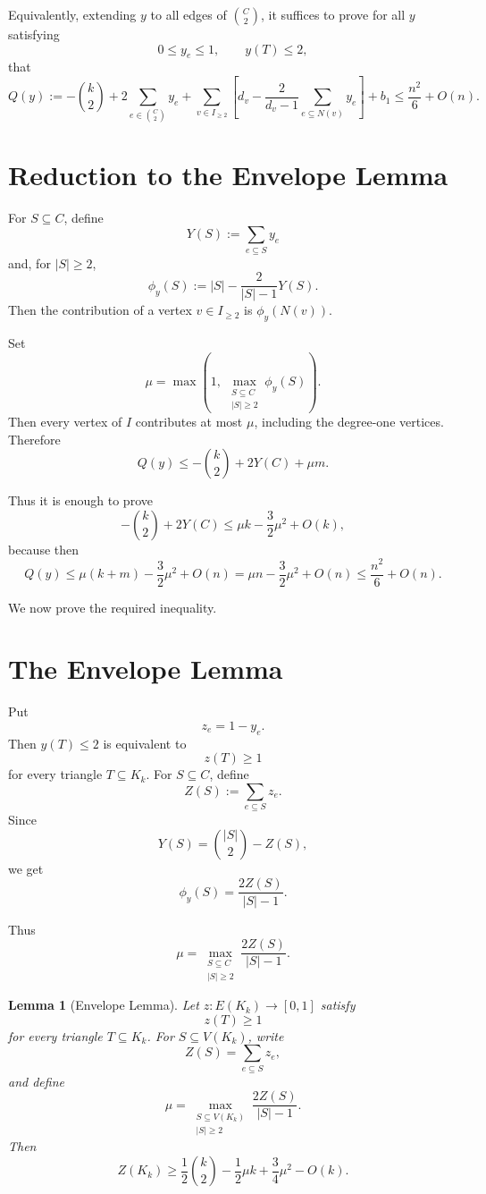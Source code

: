\documentclass[11pt]{article}
\newtheorem{lemma}{Lemma}
\begin{document}
Equivalently, extending \(y\) to all edges of \(\binom C2\), it suffices to prove for all \(y\) satisfying
\[
    0\le y_e\le1,\qquad y(T)\le2,
\]
that
\[
    Q(y):=
    -\binom{k}{2}
    +
    2\sum_{e\in \binom C2}y_e
    +
    \sum_{v\in I_{\ge2}}
    \left[
        d_v
        -
        \frac{2}{d_v-1}
        \sum_{e\subseteq N(v)}y_e
    \right]
    +
    b_1
    \le
    \frac{n^2}{6}+O(n).
\]

\section{Reduction to the Envelope Lemma}

For \(S\subseteq C\), define
\[
    Y(S):=\sum_{e\subseteq S}y_e
\]
and, for \(|S|\ge2\),
\[
    \phi_y(S):=
    |S|-\frac{2}{|S|-1}Y(S).
\]
Then the contribution of a vertex \(v\in I_{\ge2}\) is \(\phi_y(N(v))\).

Set
\[
    \mu=\max\left(
        1,\,
        \max_{\substack{S\subseteq C\\ |S|\ge2}}\phi_y(S)
    \right).
\]
Then every vertex of \(I\) contributes at most \(\mu\), including the degree-one vertices. Therefore
\[
    Q(y)
    \le
    -\binom{k}{2}+2Y(C)+\mu m.
\]

Thus it is enough to prove
\[
    -\binom{k}{2}+2Y(C)
    \le
    \mu k-\frac32\mu^2+O(k),
\]
because then
\[
    Q(y)
    \le
    \mu(k+m)-\frac32\mu^2+O(n)
    =
    \mu n-\frac32\mu^2+O(n)
    \le
    \frac{n^2}{6}+O(n).
\]

We now prove the required inequality.

\section{The Envelope Lemma}

Put
\[
    z_e=1-y_e.
\]
Then \(y(T)\le2\) is equivalent to
\[
    z(T)\ge1
\]
for every triangle \(T\subseteq K_k\). For \(S\subseteq C\), define
\[
    Z(S):=\sum_{e\subseteq S}z_e.
\]
Since
\[
    Y(S)=\binom{|S|}{2}-Z(S),
\]
we get
\[
    \phi_y(S)
    =
    \frac{2Z(S)}{|S|-1}.
\]

Thus
\[
    \mu=
    \max_{\substack{S\subseteq C\\ |S|\ge2}}
    \frac{2Z(S)}{|S|-1}.
\]

\begin{lemma}[Envelope Lemma]
Let \(z:E(K_k)\to[0,1]\) satisfy
\[
    z(T)\ge1
\]
for every triangle \(T\subseteq K_k\). For \(S\subseteq V(K_k)\), write
\[
    Z(S)=\sum_{e\subseteq S}z_e,
\]
and define
\[
    \mu=
    \max_{\substack{S\subseteq V(K_k)\\ |S|\ge2}}
    \frac{2Z(S)}{|S|-1}.
\]
Then
\[
    Z(K_k)
    \ge
    \frac12\binom{k}{2}
    -
    \frac12\mu k
    +
    \frac34\mu^2
    -
    O(k).
\]
\end{lemma}
\end{document}
